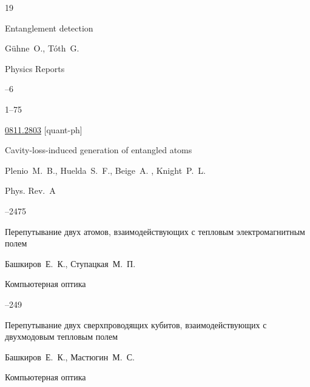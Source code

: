 \begin{thebibliography}{19}

\paper  Entanglement detection

\by G\"uhne~O., T\'oth~G.

\jour Physics Reports



--6

\pages \mbox{1--75}


\arxiv \href{http://arxiv.org/abs/0811.2803}{0811.2803} [quant-ph]












\paper Cavity-loss-induced generation of entangled atoms

\by   Plenio~M.~B.,  Huelda~S.~F.,  Beige~A. ,  Knight~P.~L.

\jour Phys. Rev.~A




--2475







\paper Перепутывание двух атомов, взаимодействующих с тепловым электромагнитным полем

\by Башкиров~Е.~К., Ступацкая~М.~П.

\jour Компьютерная оптика




--249





\paper Перепутывание двух сверхпроводящих кубитов, взаимодействующих с двухмодовым тепловым полем

\by Башкиров~Е.~К., Мастюгин~М.~С.

\jour Компьютерная оптика



\end{thebibliography}

